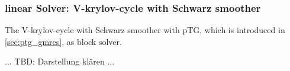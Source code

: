 \subsubsection{linear Solver: V-krylov-cycle with Schwarz smoother}
\label{sec:kcycle}

The V-krylov-cycle with Schwarz smoother with pTG, which is introduced in \ref{sec:ptg_gmres}, as block solver.

... TBD: Darstellung klären ...


